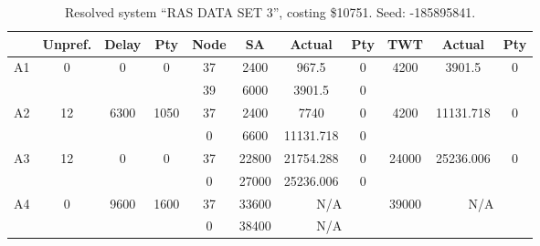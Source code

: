 \begin{sidewaystable}
\footnotesize
\caption{Resolved system ``RAS DATA SET 3'', costing \$10751. Seed: -185895841.}
\centering
\begin{tabular}{c||c|c|c||c|c|c|c||c|c|c}
  \hline \hline
  &
  Unpref. & 
  Delay &
  Pty &
  Node &
  SA &
  Actual &
  Pty &
  TWT &
  Actual &
  Pty \\
      \hline
      \multirow{2}{*}{A1} &
      \multirow{2}{*}{0} &
      \multirow{2}{*}{0} &
      \multirow{2}{*}{0} &
      37 &
      2400 &
        967.5 &
        0 &
      \multirow{2}{*}{4200} &
        \multirow{2}{*}{3901.5} &
        \multirow{2}{*}{0}
      \\
      \cline{5-8}
       &
       &
       &
       &
      39 &
      6000 &
        3901.5 &
        0 &
      
         &
        
      \\
      \hline
      \multirow{2}{*}{A2} &
      \multirow{2}{*}{12} &
      \multirow{2}{*}{6300} &
      \multirow{2}{*}{1050} &
      37 &
      2400 &
        7740 &
        0 &
      \multirow{2}{*}{4200} &
        \multirow{2}{*}{11131.718} &
        \multirow{2}{*}{0}
      \\
      \cline{5-8}
       &
       &
       &
       &
      0 &
      6600 &
        11131.718 &
        0 &
      
         &
        
      \\
      \hline
      \multirow{2}{*}{A3} &
      \multirow{2}{*}{12} &
      \multirow{2}{*}{0} &
      \multirow{2}{*}{0} &
      37 &
      22800 &
        21754.288 &
        0 &
      \multirow{2}{*}{24000} &
        \multirow{2}{*}{25236.006} &
        \multirow{2}{*}{0}
      \\
      \cline{5-8}
       &
       &
       &
       &
      0 &
      27000 &
        25236.006 &
        0 &
      
         &
        
      \\
      \hline
      \multirow{2}{*}{A4} &
      \multirow{2}{*}{0} &
      \multirow{2}{*}{9600} &
      \multirow{2}{*}{1600} &
      37 &
      33600 &
        \multicolumn{2}{|c||}{N/A} &
      \multirow{2}{*}{39000} &
        \multicolumn{2}{c}{\multirow{2}{*}{N/A}}
      \\
      \cline{5-8}
       &
       &
       &
       &
      0 &
      38400 &
        \multicolumn{2}{|c||}{N/A} &
      

\end{tabular}
\end{sidewaystable}
